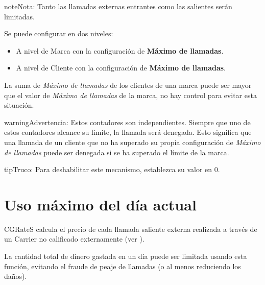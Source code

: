 \documentclass[letterpaper,10pt,spanish]{sphinxmanual}
\begin{document}
\begin{notice}{note}{Nota:}
Tanto las llamadas externas entrantes como las salientes serán limitadas.
\end{notice}

Se puede configurar en dos niveles:
\begin{itemize}
\item {} 
A nivel de Marca con la configuración de \textbf{Máximo de llamadas}.

\item {} 
A nivel de Cliente con la configuración de \textbf{Máximo de llamadas}.

\end{itemize}

La suma de \emph{Máximo de llamadas} de los clientes de una marca puede ser mayor que el valor de \emph{Máximo de llamadas} de la marca, no hay control para evitar esta situación.

\begin{notice}{warning}{Advertencia:}
Estos contadores son independientes. Siempre que uno de estos contadores alcance su límite, la llamada será denegada. Esto significa que una llamada de un cliente que no ha superado su propia configuración de \emph{Máximo de llamadas} puede ser denegada si se ha superado el límite de la marca.
\end{notice}

\begin{notice}{tip}{Truco:}
Para deshabilitar este mecanismo, establezca su valor en 0.
\end{notice}


\section{Uso máximo del día actual}
\label{security_and_maintenance/security/current_day_max_usage:current-day-max-usage}\label{security_and_maintenance/security/current_day_max_usage::doc}\label{security_and_maintenance/security/current_day_max_usage:id1}
CGRateS calcula el precio de cada llamada saliente externa realizada a través de un Carrier no calificado externamente (ver {\hyperref[administration_portal/brand/billing/index:billing]{}}).

La cantidad total de dinero gastada en un día puede ser limitada usando esta función, evitando el fraude de peaje de llamadas (o al menos reduciendo los daños).
\end{document}
